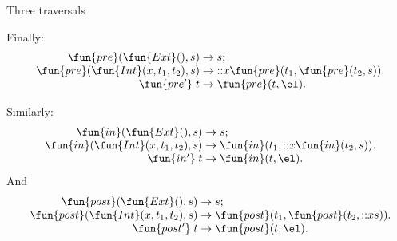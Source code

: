 %
\begin{frame}{Three traversals}

  Finally:
  \begin{equation*}
    \begin{array}{r@{\;}l@{\;}l@{}}
      \fun{pre}(\fun{Ext}(), s) & \rightarrow & s; \\
      \fun{pre}(\fun{Int}(x, t_1, t_2), s) & \rightarrow
      & \cons{x}{\fun{pre}(t_1, \fun{pre}(t_2, s))}.\\
      \fun{pre'} \; t & \rightarrow & \fun{pre}(t, \el).
    \end{array}
  \end{equation*}

  Similarly:
  \begin{equation*}
    \begin{array}{r@{\;}l@{\;}l@{}}
      \fun{in}(\fun{Ext}(), s) & \rightarrow & s; \\
      \fun{in}(\fun{Int}(x, t_1, t_2), s) & \rightarrow
      & \fun{in}(t_1, \cons{x}{\fun{in}(t_2, s)}).\\
      \fun{in'} \; t & \rightarrow & \fun{in}(t, \el).
    \end{array}
  \end{equation*}
  And
  \begin{equation*}
    \begin{array}{r@{\;}l@{\;}l@{}}
      \fun{post}(\fun{Ext}(), s) & \rightarrow & s; \\
      \fun{post}(\fun{Int}(x, t_1, t_2), s) & \rightarrow
      & \fun{post}(t_1, \fun{post}(t_2, \cons{x}{s})).\\
      \fun{post'} \; t & \rightarrow & \fun{post}(t, \el).
    \end{array}
  \end{equation*}

\end{frame}


